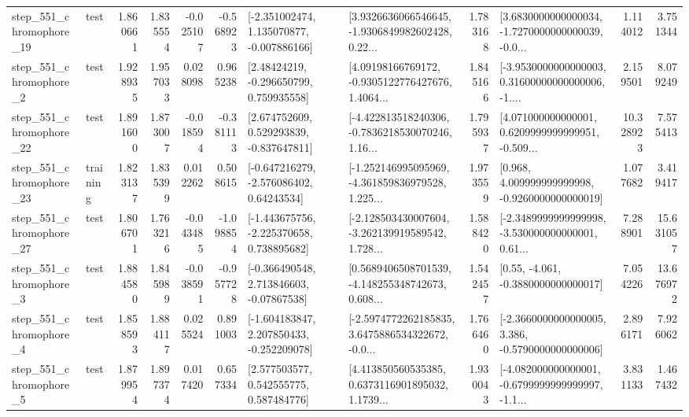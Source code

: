 \begin{tabular}{llrrrrllrlrr}
  step\_551\_chromophore\_19 &      test &      1.860661 &    1.835554 &     -0.025107 & -0.568923 &   [-2.351002474, 1.135070877, -0.007886166] &  [3.9326636066546645, -1.9306849982602428, 0.22... &       1.783168 &  [3.6830000000000034, -1.7270000000000039, -0.0... &            1.114012 &          3.751344 \\
   step\_551\_chromophore\_2 &      test &      1.928935 &    1.957033 &      0.028098 &  0.965238 &     [2.48424219, -0.296650799, 0.759935558] &  [4.09198166769172, -0.9305122776427676, 1.4064... &       1.845166 &  [-3.9530000000000003, 0.31600000000000006, -1.... &            2.159501 &          8.079249 \\
  step\_551\_chromophore\_22 &      test &      1.891600 &    1.873007 &     -0.018594 & -0.381113 &    [2.674752609, 0.529293839, -0.837647811] &  [-4.422813518240306, -0.7836218530070246, 1.16... &       1.795937 &  [4.071000000000001, 0.6209999999999951, -0.509... &           10.328923 &          7.575413 \\
  step\_551\_chromophore\_23 &  training &      1.823137 &    1.835399 &      0.012262 &  0.508615 &    [-0.647216279, -2.576086402, 0.64243534] &  [-1.252146995095969, -4.361859836979528, 1.225... &       1.973559 &    [0.968, 4.009999999999998, -0.9260000000000019] &            1.077682 &          3.419417 \\
  step\_551\_chromophore\_27 &      test &      1.806701 &    1.763216 &     -0.043485 & -1.098854 &   [-1.443675756, -2.225370658, 0.738895682] &  [-2.128503430007604, -3.262139919589542, 1.728... &       1.588420 &  [-2.3489999999999998, -3.530000000000001, 0.61... &            7.288901 &         15.631057 \\
   step\_551\_chromophore\_3 &      test &      1.884580 &    1.845989 &     -0.038591 & -0.957728 &    [-0.366490548, 2.713846603, -0.07867538] &  [0.5689406508701539, -4.148255348742673, 0.608... &       1.542457 &                [0.55, -4.061, -0.3880000000000017] &            7.054226 &         13.676972 \\
   step\_551\_chromophore\_4 &      test &      1.858593 &    1.884117 &      0.025524 &  0.891003 &   [-1.604183847, 2.207850433, -0.252209078] &  [-2.5974772262185835, 3.6475886534322672, -0.0... &       1.766460 &  [-2.3660000000000005, 3.386, -0.5790000000000006] &            2.896171 &          7.926062 \\
   step\_551\_chromophore\_5 &      test &      1.879954 &    1.897374 &      0.017420 &  0.657334 &     [2.577503577, 0.542555775, 0.587484776] &  [4.413850560535385, 0.6373116901895032, 1.1739... &       1.930043 &  [-4.082000000000001, -0.6799999999999997, -1.1... &            3.831133 &          1.467432 \\

\end{tabular}
